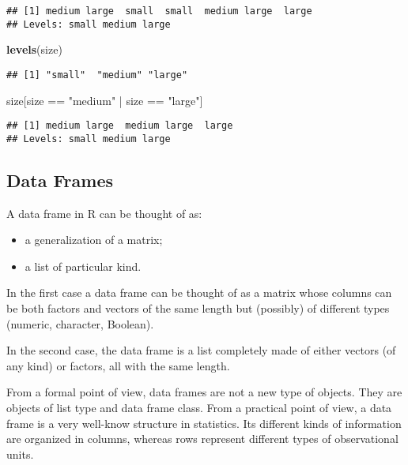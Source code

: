 \documentclass[]{book}
\newenvironment{Shaded}{\begin{snugshade}}{\end{snugshade}}
\newcommand{\KeywordTok}[1]{\textcolor[rgb]{0.13,0.29,0.53}{\textbf{{#1}}}}
\newcommand{\StringTok}[1]{\textcolor[rgb]{0.31,0.60,0.02}{{#1}}}
\newcommand{\NormalTok}[1]{{#1}}
\providecommand{\tightlist}{%
  \setlength{\itemsep}{0pt}\setlength{\parskip}{0pt}}
\def\tightlist{}
\begin{document}
\begin{verbatim}
## [1] medium large  small  small  medium large  large 
## Levels: small medium large
\end{verbatim}

\begin{Shaded}
\begin{Highlighting}[]
\KeywordTok{levels}\NormalTok{(size)}
\end{Highlighting}
\end{Shaded}

\begin{verbatim}
## [1] "small"  "medium" "large"
\end{verbatim}

\begin{Shaded}
\begin{Highlighting}[]
\NormalTok{size[size ==}\StringTok{ "medium"} \NormalTok{|}\StringTok{ }\NormalTok{size ==}\StringTok{ "large"}\NormalTok{]}
\end{Highlighting}
\end{Shaded}

\begin{verbatim}
## [1] medium large  medium large  large 
## Levels: small medium large
\end{verbatim}

\subsection{Data Frames}\label{data-frames}

A data frame in R can be thought of as:

\begin{itemize}
\tightlist
\item
  a generalization of a matrix;
\item
  a list of particular kind.
\end{itemize}

In the first case a data frame can be thought of as a matrix whose
columns can be both factors and vectors of the same length but
(possibly) of different types (numeric, character, Boolean).

In the second case, the data frame is a list completely made of either
vectors (of any kind) or factors, all with the same length.

From a formal point of view, data frames are not a new type of objects.
They are objects of list type and data frame class. From a practical
point of view, a data frame is a very well-know structure in statistics.
Its different kinds of information are organized in columns, whereas
rows represent different types of observational units.
\end{document}
